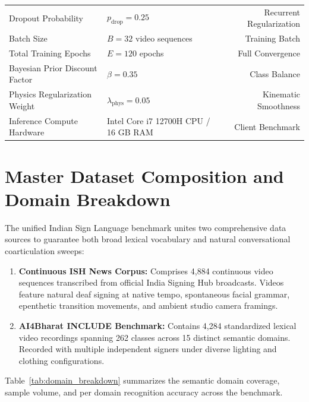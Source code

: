 \documentclass[10pt,conference]{IEEEtran}
\begin{document}
\begin{table}[!htbp]
{\begin{tabular}{llr}
Dropout Probability & $p_{\text{drop}} = 0.25$ & Recurrent Regularization \\
Batch Size & $B = 32$ video sequences & Training Batch \\
Total Training Epochs & $E = 120$ epochs & Full Convergence \\
Bayesian Prior Discount Factor & $\beta = 0.35$ & Class Balance \\
Physics Regularization Weight & $\lambda_{\text{phys}} = 0.05$ & Kinematic Smoothness \\
Inference Compute Hardware & Intel Core i7 12700H CPU / 16 GB RAM & Client Benchmark \\
\bottomrule
\end{tabular}%
}
\end{table}

\section{Master Dataset Composition and Domain Breakdown}

The unified Indian Sign Language benchmark unites two comprehensive data sources to guarantee both broad lexical vocabulary and natural conversational coarticulation sweeps:
\begin{enumerate}
    \item \textbf{Continuous ISH News Corpus:} Comprises 4,884 continuous video sequences transcribed from official India Signing Hub broadcasts. Videos feature natural deaf signing at native tempo, spontaneous facial grammar, epenthetic transition movements, and ambient studio camera framings.
    \item \textbf{AI4Bharat INCLUDE Benchmark:} Contains 4,284 standardized lexical video recordings spanning 262 classes across 15 distinct semantic domains. Recorded with multiple independent signers under diverse lighting and clothing configurations.
\end{enumerate}

Table~\ref{tab:domain_breakdown} summarizes the semantic domain coverage, sample volume, and per domain recognition accuracy across the benchmark.
\end{document}
